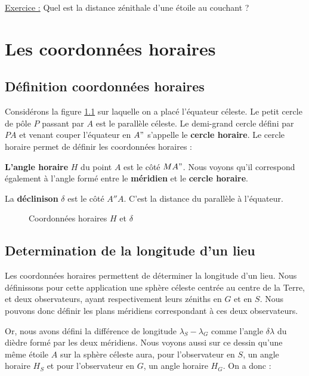 \documentclass[12pt]{report}
\begin{document}
\bigskip

\underline{Exercice :} Quel est la distance zénithale d'une étoile au couchant ?


\chapter{Les coordonnées horaires}
\section{Définition coordonnées horaires}

Considérons la figure \ref{fig:16} sur laquelle on a placé l'équateur céleste. Le petit cercle de pôle $P$ passant par $A$ est le parallèle céleste. Le demi-grand cercle défini par $PA$ et venant couper l'équateur en $A"$ s'appelle le \textbf{cercle horaire}. Le cercle horaire permet de définir les coordonnées horaires :

\textbf{L'angle horaire } $H$ du point $A$ est le côté $MA"$. Nous voyons qu'il correspond également à l'angle formé entre le \textbf{méridien} et le \textbf{cercle horaire}.

La \textbf{déclinison} $\delta$ est le côté $A''A$. C'est la distance du parallèle à l'équateur.



\begin{figure}[ht]
\begin{center}
\end{center}
\caption{Coordonnées horaires $H$ et $\delta$}
\label{fig:16}
\end{figure}


\section{Determination de la longitude d'un lieu}

Les coordonnées horaires permettent de déterminer la longitude d'un lieu. Nous définissons pour cette application une sphère céleste centrée au centre de la Terre, et deux observateurs, ayant respectivement leurs zéniths en $G$ et en $S$. Nous pouvons donc définir les plans méridiens correspondant à ces deux observateurs.

Or, nous avons défini la différence de longitude $\lambda_S - \lambda_G$ comme l'angle $\delta \lambda$ du dièdre formé par les deux méridiens.  Nous voyons aussi sur ce dessin qu'une même étoile $A$ sur la sphère céleste aura, pour l'observateur en $S$, un angle horaire $H_S$ et pour l'observateur en $G$, un angle horaire $H_G$. On a donc :
\end{document}
